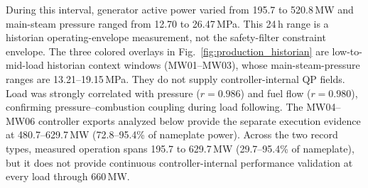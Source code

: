 During this interval, generator active power varied from 195.7 to 520.8\,MW and main-steam pressure ranged from 12.70 to 26.47\,MPa. This 24\,h range is a historian operating-envelope measurement, not the safety-filter constraint envelope. The three colored overlays in Fig.~\ref{fig:production_historian} are low-to-mid-load historian context windows (MW01--MW03), whose main-steam-pressure ranges are 13.21--19.15\,MPa. They do not supply controller-internal QP fields. Load was strongly correlated with pressure ($r=0.986$) and fuel flow ($r=0.980$), confirming pressure--combustion coupling during load following. The MW04--MW06 controller exports analyzed below provide the separate execution evidence at 480.7--629.7\,MW (72.8--95.4\% of nameplate power). Across the two record types, measured operation spans 195.7 to 629.7\,MW (29.7--95.4\% of nameplate), but it does not provide continuous controller-internal performance validation at every load through 660\,MW.

